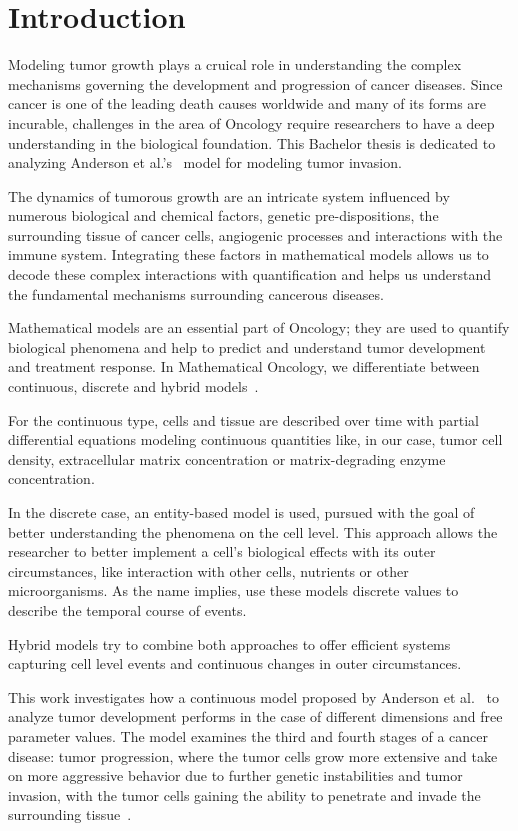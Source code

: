 \section{Introduction}
Modeling tumor growth plays a cruical role in understanding the complex mechanisms governing the development and progression of cancer diseases. Since cancer is one of the leading death causes worldwide and many of its forms are incurable, challenges in the area of Oncology require researchers to have a deep understanding in the biological foundation. This Bachelor thesis is dedicated to analyzing Anderson et al.'s~\cite{anderson_continuous_1998,anderson_mathematical_2000} model for modeling tumor invasion.

The dynamics of tumorous growth are an intricate system influenced by numerous biological and chemical factors, genetic pre-dispositions, the surrounding tissue of cancer cells, angiogenic processes and interactions with the immune system. Integrating these factors in mathematical models allows us to decode these complex interactions with quantification and helps us understand the fundamental mechanisms surrounding cancerous diseases.

Mathematical models are an essential part of Oncology; they are used to quantify biological phenomena and help to predict and understand tumor development and treatment response. In Mathematical Oncology, we differentiate between continuous, discrete and hybrid models~\cite{BEKISZ2020101198}. 

For the continuous type, cells and tissue are described over time with partial differential equations modeling continuous quantities like, in our case, tumor cell density, extracellular matrix concentration or matrix-degrading enzyme concentration.

In the discrete case, an entity-based model is used, pursued with the goal of better understanding the phenomena on the cell level. This approach allows the researcher to better implement a cell's biological effects with its outer circumstances, like interaction with other cells, nutrients or other microorganisms. As the name implies, use these models discrete values to describe the temporal course of events.

Hybrid models try to combine both approaches to offer efficient systems capturing cell level events and continuous changes in outer circumstances.

This work investigates how a continuous model proposed by Anderson et al.~\cite{anderson_continuous_1998,anderson_mathematical_2000} to analyze tumor development performs in the case of different dimensions and free parameter values. The model examines the third and fourth stages of a cancer disease: tumor progression, where the tumor cells grow more extensive and take on more aggressive behavior due to further genetic instabilities and tumor invasion, with the tumor cells gaining the ability to penetrate and invade the surrounding tissue~\cite{10.1158/2159-8290.CD-21-1059}. 

